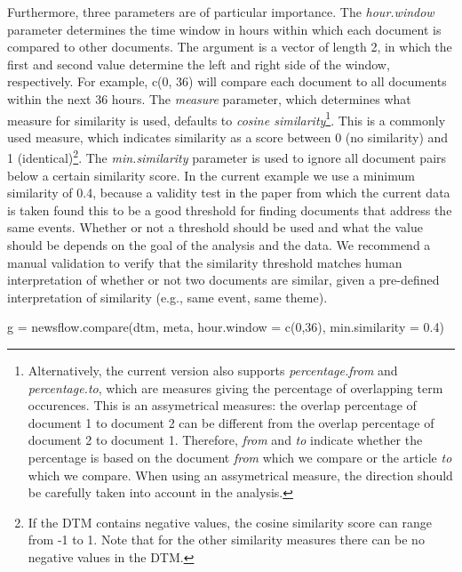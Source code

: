 Furthermore, three parameters are of particular importance. The
\emph{hour.window} parameter determines the time window in hours within
which each document is compared to other documents. The argument is a
vector of length 2, in which the first and second value determine the
left and right side of the window, respectively. For example, c(0, 36)
will compare each document to all documents within the next 36 hours.
The \emph{measure} parameter, which determines what measure for
similarity is used, defaults to \emph{cosine similarity}\footnote{Alternatively,
  the current version also supports \emph{percentage.from} and
  \emph{percentage.to}, which are measures giving the percentage of
  overlapping term occurences. This is an assymetrical measures: the
  overlap percentage of document 1 to document 2 can be different from
  the overlap percentage of document 2 to document 1. Therefore,
  \emph{from} and \emph{to} indicate whether the percentage is based on
  the document \emph{from} which we compare or the article \emph{to}
  which we compare. When using an assymetrical measure, the direction
  should be carefully taken into account in the analysis.}. This is a
commonly used measure, which indicates similarity as a score between 0
(no similarity) and 1 (identical)\footnote{If the DTM contains negative
  values, the cosine similarity score can range from -1 to 1. Note that
  for the other similarity measures there can be no negative values in
  the DTM.}. The \emph{min.similarity} parameter is used to ignore all
document pairs below a certain similarity score. In the current example
we use a minimum similarity of 0.4, because a validity test in the paper
from which the current data is taken found this to be a good threshold
for finding documents that address the same events. Whether or not a
threshold should be used and what the value should be depends on the
goal of the analysis and the data. We recommend a manual validation to
verify that the similarity threshold matches human interpretation of
whether or not two documents are similar, given a pre-defined
interpretation of similarity (e.g., same event, same theme).

\begin{Schunk}
\begin{Sinput}
g = newsflow.compare(dtm, meta,
                             hour.window = c(0,36), 
                             min.similarity = 0.4)
\end{Sinput}
\end{Schunk}

